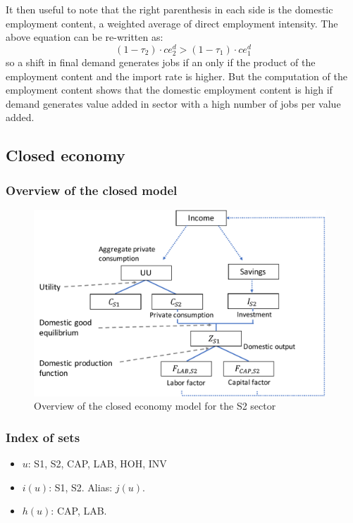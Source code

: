 It then useful to note that the right parenthesis in each side is the domestic employment content, a weighted average of direct employment intensity. The above equation can be re-written as:
$$(1-\tau_2) \cdot ce^d_2> (1-\tau_1) \cdot ce^d_1 $$
so a shift in final demand generates jobs if an only if the product of the employment content and the import rate is higher.
But the computation of the employment content shows that the domestic employment content is high if demand generates value added in sector with a high number of jobs per value added.

\clearpage

\subsection{Closed economy}
\label{app:closed_economy}

\subsubsection{Overview of the closed model}
\begin{figure}[!h]
	\centering
	\includegraphics[height=7cm]{figures/overview_closed.pdf}
	\caption{Overview of the closed economy model for the S2 sector}
	\label{fig:overview_closed}
\end{figure}

\subsubsection{Index of sets}
\begin{itemize}
	\item $u$: S1, S2, CAP, LAB, HOH, INV
	\item $i(u)$: S1, S2. Alias: $j(u)$.
	\item $h(u)$: CAP, LAB.
\end{itemize}

